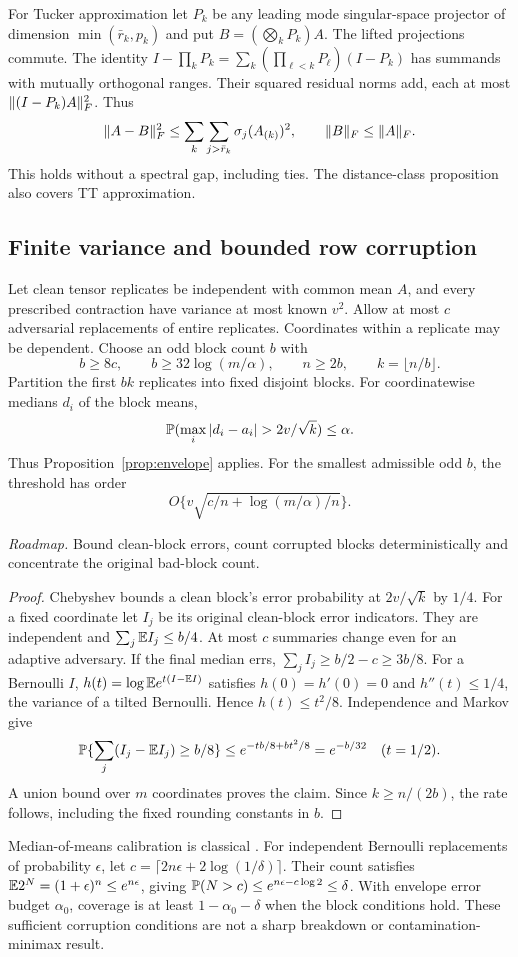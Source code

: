 For Tucker approximation let $P_k$ be any leading mode singular-space projector of dimension $\min(\bar r_k,p_k)$ and put $B=(\bigotimes_kP_k)A$.
The lifted projections commute. The identity
$I-\prod_kP_k=\sum_k(\prod_{\ell<k}P_\ell)(I-P_k)$
has summands with mutually orthogonal ranges.
Their squared residual norms add, each at most $\lVert (I-P_k)A\rVert_F^2$.
Thus
\[
 \lVert A-B\rVert_F^2\le\sum_k\sum_{j>\bar r_k}\sigma_j(A_{(k)})^2,
 \qquad \lVert B\rVert_F\le\lVert A\rVert_F.
\]
This holds without a spectral gap, including ties.
The distance-class proposition also covers TT approximation.

\subsection{Finite variance and bounded row corruption}
\begin{proposition}\label{prop:mom}
Let clean tensor replicates be independent with common mean $A$, and every prescribed contraction have variance at most known $v^2$. Allow at most $c$ adversarial replacements of entire replicates. Coordinates within a replicate may be dependent. Choose an odd block count $b$ with
\[
 b\ge8c,\qquad b\ge32\log(m/\alpha),\qquad n\ge2b,
 \qquad k=\lfloor n/b\rfloor.
\]
Partition the first $bk$ replicates into fixed disjoint blocks.
For coordinatewise medians $d_i$ of the block means,
\[
 \PP(\max_i|d_i-a_i|>2v/\sqrt k)\le\alpha.
\]
Thus Proposition~\ref{prop:envelope} applies. For the smallest admissible odd $b$,
the threshold has order
\[
 O\{v\sqrt{c/n+\log(m/\alpha)/n}\}.
\]
\end{proposition}
\noindent\emph{Roadmap.} Bound clean-block errors, count corrupted blocks deterministically and concentrate the original bad-block count.
\begin{proof}
Chebyshev bounds a clean block's error probability at $2v/\sqrt k$ by $1/4$.
For a fixed coordinate let $I_j$ be its original clean-block error indicators.
They are independent and $\sum_j\mathbb E I_j\le b/4$.
At most $c$ summaries change even for an adaptive adversary.
If the final median errs, $\sum_j I_j\ge b/2-c\ge3b/8$.
For a Bernoulli $I$, $h(t)=\log\mathbb E e^{t(I-\mathbb E I)}$ satisfies
$h(0)=h'(0)=0$ and $h''(t)\le1/4$, the variance of a tilted Bernoulli.
Hence $h(t)\le t^2/8$.
Independence and Markov give
\[
 \mathbb P\{\sum_j(I_j-\mathbb E I_j)\ge b/8\}
 \le e^{-tb/8+bt^2/8}=e^{-b/32}\quad(t=1/2).
\]
A union bound over $m$ coordinates proves the claim. Since $k\ge n/(2b)$,
the rate follows, including the fixed rounding constants in $b$.
\end{proof}
Median-of-means calibration is classical \citep{devroye2016}.
For independent Bernoulli replacements of probability $\epsilon$, let
$c=\lceil2n\epsilon+2\log(1/\delta)\rceil$.
Their count satisfies $\mathbb E2^N=(1+\epsilon)^n\le e^{n\epsilon}$, giving
$\mathbb P(N>c)\le e^{n\epsilon-c\log2}\le\delta$.
With envelope error budget $\alpha_0$, coverage is at least
$1-\alpha_0-\delta$ when the block conditions hold.
These sufficient corruption conditions are not a sharp breakdown or contamination-minimax result.

